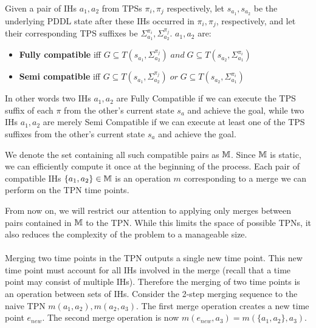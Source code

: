 \begin{definition}
Given a pair of IHs $a_1,a_2$ from TPSs $\pi_i,\pi_j$ respectively, 
let $s_{a_1},s_{a_2}$ be 
the underlying PDDL state after these IHs occurred in $\pi_i,\pi_j$, respectively, and let their corresponding TPS suffixes be $\Sigma^{\pi_i}_{a_1}, \Sigma^{\pi_j}_{a_2}$.
$a_1,a_2$ are:
\begin{itemize}
    \item \textbf{Fully compatible} iff $G \subseteq T(s_{a_1},\Sigma^{\pi_j}_{a_2}) \; and \; G \subseteq T(s_{a_2},\Sigma^{\pi_i}_{a_1})$
    \item  \textbf{Semi compatible} iff $G \subseteq T(s_{a_1},\Sigma^{\pi_j}_{a_2}) \;  or \;  G \subseteq T(s_{a_2},\Sigma^{\pi_i}_{a_1})$
\end{itemize}
\end{definition}

In other words two IHs $a_1,a_2$ are Fully Compatible if we can execute the TPS suffix of each $\pi$ from the other's current state $s_a$ and achieve the goal, while two IHs $a_1,a_2$ are merely Semi Compatible if we can execute at least one of the TPS suffixes from the other's current state $s_a$ and achieve the goal.

We denote the set containing all such compatible pairs as $\mathbb{M}$. Since $\mathbb{M}$ is static, we can efficiently compute it once at the beginning of the process.
Each pair of compatible IHs $\{a_1,a_2\} \in \mathbb{M}$ is an operation $m$ corresponding to a merge we can perform on the TPN time points. 

From now on, we will restrict our attention to applying only merges between pairs contained in $\mathbb{M}$ to the TPN. While this limits the space of possible TPNs, it also reduces the complexity of the problem to a manageable size.
\\ \\  
Merging two time points in the TPN outputs a single new time point. This new time point must account for all IHs involved in the merge (recall that a time point may consist of multiple IHs). Therefore the merging of two time points is an operation between sets of IHs. Consider the 2-step merging sequence to the naive TPN $m(a_1,a_2),m(a_2,a_3)$. The first merge operation creates a new time point $e_{new}$. The second merge operation is now $m(e_{new},a_3)=m(\{a_1,a_2\},a_3)$.

